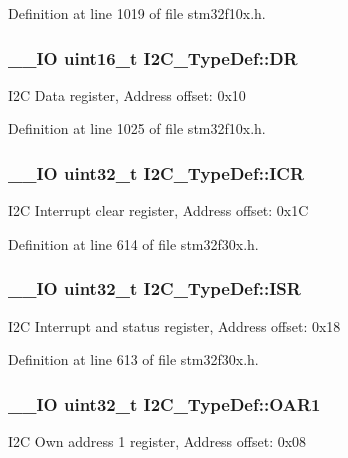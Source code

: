 Definition at line 1019 of file stm32f10x.\-h.

\hypertarget{struct_i2_c___type_def_a5c1551b886fbb8e801b9203f6d7dc7c5}{
\subsubsection[{D\-R}]{\setlength{\rightskip}{0pt plus 5cm}\-\_\-\-\_\-\-I\-O {\bf uint16\-\_\-t} I2\-C\-\_\-\-Type\-Def\-::\-D\-R}}\label{struct_i2_c___type_def_a5c1551b886fbb8e801b9203f6d7dc7c5}
I2\-C Data register, Address offset\-: 0x10 

Definition at line 1025 of file stm32f10x.\-h.

\hypertarget{struct_i2_c___type_def_a790a1957ec69244915a9637f7d925cf7}{
\subsubsection[{I\-C\-R}]{\setlength{\rightskip}{0pt plus 5cm}\-\_\-\-\_\-\-I\-O {\bf uint32\-\_\-t} I2\-C\-\_\-\-Type\-Def\-::\-I\-C\-R}}\label{struct_i2_c___type_def_a790a1957ec69244915a9637f7d925cf7}
I2\-C Interrupt clear register, Address offset\-: 0x1\-C 

Definition at line 614 of file stm32f30x.\-h.

\hypertarget{struct_i2_c___type_def_a0f73f2b049d95841c54313f0cc949afe}{
\subsubsection[{I\-S\-R}]{\setlength{\rightskip}{0pt plus 5cm}\-\_\-\-\_\-\-I\-O {\bf uint32\-\_\-t} I2\-C\-\_\-\-Type\-Def\-::\-I\-S\-R}}\label{struct_i2_c___type_def_a0f73f2b049d95841c54313f0cc949afe}
I2\-C Interrupt and status register, Address offset\-: 0x18 

Definition at line 613 of file stm32f30x.\-h.

\hypertarget{struct_i2_c___type_def_ae8269169fcbdc2ecb580208d99c2f89f}{
\subsubsection[{O\-A\-R1}]{\setlength{\rightskip}{0pt plus 5cm}\-\_\-\-\_\-\-I\-O {\bf uint32\-\_\-t} I2\-C\-\_\-\-Type\-Def\-::\-O\-A\-R1}}\label{struct_i2_c___type_def_ae8269169fcbdc2ecb580208d99c2f89f}
I2\-C Own address 1 register, Address offset\-: 0x08 

